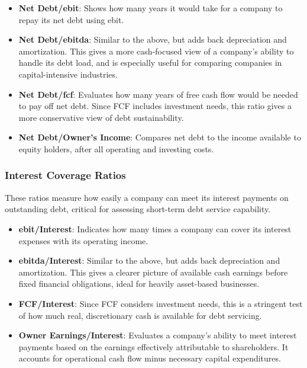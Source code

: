 \documentclass[11pt,english,a4paper,hidelinks]{book}
\begin{document}
\begin{itemize}
    \item \textbf{Net Debt/\acrshort{ebit}}: Shows how many years it would take for a company to repay its net debt using \acrshort{ebit}.
    
    \item \textbf{Net Debt/\acrshort{ebitda}}: Similar to the above, but adds back depreciation and amortization. This gives a more cash-focused view of a company's ability to handle its debt load, and is especially useful for comparing companies in capital-intensive industries.
    
    \item \textbf{Net Debt/\acrshort{fcf}}: Evaluates how many years of free cash flow would be needed to pay off net debt. Since FCF includes investment needs, this ratio gives a more conservative view of debt sustainability.
    
    \item \textbf{Net Debt/Owner's Income}: Compares net debt to the income available to equity holders, after all operating and investing costs.
\end{itemize}

\subsubsection{Interest Coverage Ratios}
These ratios measure how easily a company can meet its interest payments on outstanding debt, critical for assessing short-term debt service capability.

\begin{itemize}
    \item \textbf{\acrshort{ebit}/Interest}: Indicates how many times a company can cover its interest expenses with its operating income.
    
    \item \textbf{\acrshort{ebitda}/Interest}: Similar to the above, but adds back depreciation and amortization. This gives a clearer picture of available cash earnings before fixed financial obligations, ideal for heavily asset-based businesses.
    
    \item \textbf{FCF/Interest}: Since FCF considers investment needs, this is a stringent test of how much real, discretionary cash is available for debt servicing.
    
    \item \textbf{Owner Earnings/Interest}: Evaluates a company's ability to meet interest payments based on the earnings effectively attributable to shareholders. It accounts for operational cash flow minus necessary capital expenditures.
\end{itemize}
\end{document}
